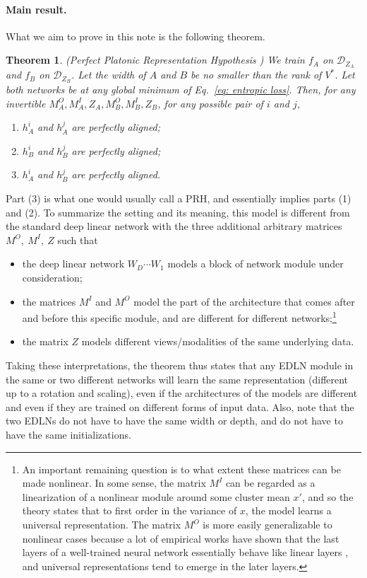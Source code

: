 \documentclass[11pt]{article}
\theoremstyle{plain}
\newtheorem{theorem}{Theorem}
\begin{document}
\paragraph{Main result.} What we aim to prove in this note is the following theorem.
\begin{theorem}\label{theo: main}
    (Perfect Platonic Representation Hypothesis \cite{ziyin2025neural}) We train $f_A$ on $\mathcal{D}_{Z_A}$ and $f_B$ on $\mathcal{D}_{Z_B}$. Let the width of $A$ and $B$ be no smaller than the rank of $V^*$. Let both networks be at any global minimum of Eq.~\eqref{eq: entropic loss}. Then, for any invertible $M^O_A, M^I_A, Z_A, M^O_B, M^I_B, Z_B$, for any possible pair of $i$ and $j$, 
    \begin{enumerate}[noitemsep,topsep=0pt, parsep=0pt,partopsep=0pt, leftmargin=25pt]
        \item $h^i_A$ and $h^j_A$ are {perfectly aligned};
        \item $h^i_B$ and $h^j_B$ are {perfectly aligned};
        \item $h^i_A$ and $h^j_B$ are {perfectly aligned}.
    \end{enumerate}
\end{theorem}
Part (3) is what one would usually call a PRH, and essentially implies parts (1) and (2). To summarize the setting and its meaning, this model is different from the standard deep linear network with the three additional arbitrary matrices $M^O,\ M^I,\ Z$ such that
\begin{itemize}[noitemsep,topsep=0pt, parsep=0pt,partopsep=0pt, leftmargin=25pt]
    \item the deep linear network $W_D\cdots W_1$ models a block of network module under consideration;
    \item the matrices $M^I$ and $M^O$ model the part of the architecture that comes after and before this specific module, and are different for different networks;\footnote{An important remaining question is to what extent these matrices can be made nonlinear. In some sense, the matrix $M^I$ can be regarded as a linearization of a nonlinear module around some cluster mean $x'$, and so the theory states that to first order in the variance of $x$, the model learns a universal representation. The matrix $M^O$ is more easily generalizable to nonlinear cases because a lot of empirical works have shown that the last layers of a well-trained neural network essentially behave like linear layers \cite{masarczyk2024tunnel}, and universal representations tend to emerge in the later layers.}
    \item the matrix $Z$ models different views/modalities of the same underlying data.
\end{itemize}
Taking these interpretations, the theorem thus states that any EDLN module in the same or two different networks will learn the same representation (different up to a rotation and scaling), even if the architectures of the models are different and even if they are trained on different forms of input data. Also, note that the two EDLNs do not have to have the same width or depth, and do not have to have the same initializations.
\end{document}
